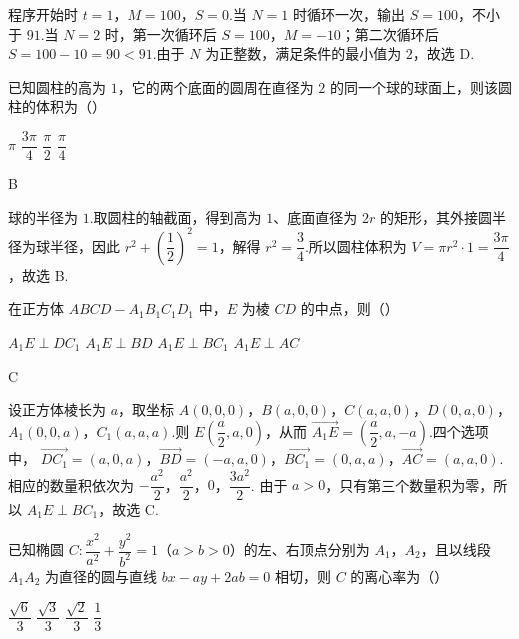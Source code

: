 \begin{solution}
程序开始时 \(t=1\)，\(M=100\)，\(S=0\).当 \(N=1\) 时循环一次，输出 \(S=100\)，不小于 \(91\).当 \(N=2\) 时，第一次循环后 \(S=100\)，\(M=-10\)；第二次循环后 \(S=100-10=90<91\).由于 \(N\) 为正整数，满足条件的最小值为 \(2\)，故选 D.
\end{solution}

\begin{problem}
已知圆柱的高为 \(1\)，它的两个底面的圆周在直径为 \(2\) 的同一个球的球面上，则该圆柱的体积为（\quad）

\choices
    {\(\pi\)}
    {\(\dfrac{3\pi}{4}\)}
    {\(\dfrac{\pi}{2}\)}
    {\(\dfrac{\pi}{4}\)}
\end{problem}

\begin{answer}
B
\end{answer}

\begin{solution}
球的半径为 \(1\).取圆柱的轴截面，得到高为 \(1\)、底面直径为 \(2r\) 的矩形，其外接圆半径为球半径，因此
\(r^2+\left(\dfrac12\right)^2=1\)，解得 \(r^2=\dfrac34\).所以圆柱体积为 \(V=\pi r^2\cdot1=\dfrac{3\pi}{4}\)，故选 B.
\end{solution}

\begin{problem}
在正方体 \(ABCD-A_1B_1C_1D_1\) 中，\(E\) 为棱 \(CD\) 的中点，则（\quad）

\choices
    {\(A_1E\perp DC_1\)}
    {\(A_1E\perp BD\)}
    {\(A_1E\perp BC_1\)}
    {\(A_1E\perp AC\)}
\end{problem}

\begin{answer}
C
\end{answer}

\begin{solution}
设正方体棱长为 \(a\)，取坐标
\(A(0,0,0)\)，\(B(a,0,0)\)，\(C(a,a,0)\)，\(D(0,a,0)\)，\(A_1(0,0,a)\)，\(C_1(a,a,a)\).则 \(E\left(\dfrac a2,a,0\right)\)，从而
\(\overrightarrow{A_1E}=\left(\dfrac a2,a,-a\right)\).四个选项中，
\(\overrightarrow{DC_1}=(a,0,a)\)，\(\overrightarrow{BD}=(-a,a,0)\)，\(\overrightarrow{BC_1}=(0,a,a)\)，\(\overrightarrow{AC}=(a,a,0)\).
相应的数量积依次为
\(-\dfrac{a^2}{2}\)，\(\dfrac{a^2}{2}\)，\(0\)，\(\dfrac{3a^2}{2}\).
由于 \(a>0\)，只有第三个数量积为零，所以 \(A_1E\perp BC_1\)，故选 C.
\end{solution}

\begin{problem}
已知椭圆 \(C:\dfrac{x^2}{a^2}+\dfrac{y^2}{b^2}=1\)（\(a>b>0\)）的左、右顶点分别为 \(A_1\)，\(A_2\)，且以线段 \(A_1A_2\) 为直径的圆与直线 \(bx-ay+2ab=0\) 相切，则 \(C\) 的离心率为（\quad）

\choices
    {\(\dfrac{\sqrt6}{3}\)}
    {\(\dfrac{\sqrt3}{3}\)}
    {\(\dfrac{\sqrt2}{3}\)}
    {\(\dfrac13\)}
\end{problem}

